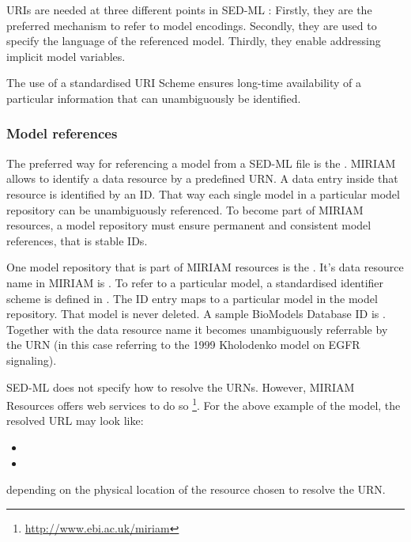 \label{sec:uriScheme}

URIs are needed at three different points in SED-ML \LoneVone: 
Firstly, they are the preferred mechanism to refer to model encodings. 
Secondly, they are used to specify the language of the referenced model.
Thirdly, they enable addressing implicit model variables.

The use of a standardised URI Scheme ensures long-time availability  of a particular information that can unambiguously be identified. 

\subsubsection{Model references}
The preferred way for referencing a model from a SED-ML file is the .
MIRIAM allows to identify  a data resource by a predefined URN. A data entry inside that resource is identified by an ID. 
That way each single  model  in a particular model repository can be unambiguously referenced. To become part of MIRIAM resources, a model repository must ensure permanent and consistent model references, that is stable IDs.

One model repository that is part of MIRIAM resources is the . It's data resource name in MIRIAM is . To refer to a particular model, a standardised identifier scheme is defined in . The ID entry maps to a particular model in the model repository. That model is never deleted. 
A sample BioModels Database ID is . Together with the data resource name it becomes unambiguously referrable by the URN  (in this case referring to the 1999 Kholodenko model on EGFR signaling). 
%

SED-ML does not specify how to resolve the URNs. However, MIRIAM Resources offers web services to do so \footnote{\url{http://www.ebi.ac.uk/miriam}}. For the above example of the  model, the resolved URL may look like: 
\begin{itemize}
 \item{}
 \item{}
\end{itemize}
depending on the physical location of the resource chosen to resolve the URN.

